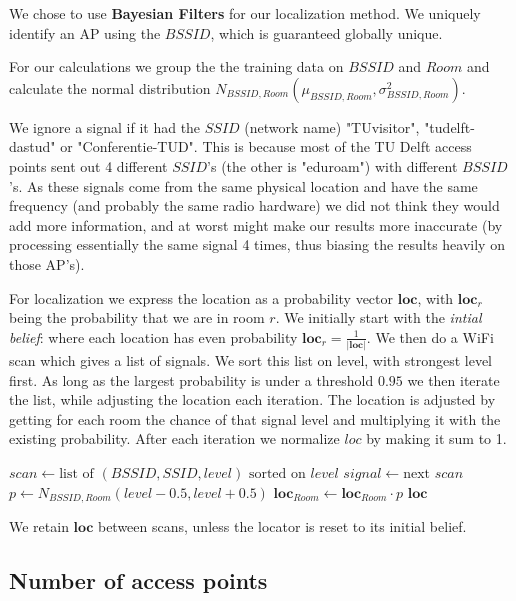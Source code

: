 \documentclass[a4paper,10pt,twoside]{IEEEtran}
\begin{document}
We chose to use \textbf{Bayesian Filters} for our localization method. We uniquely identify an AP using the $BSSID$, which is guaranteed globally unique.

For our calculations we group the the training data on $BSSID$ and $Room$ and calculate the normal distribution $N_{BSSID,Room}(\mu_{BSSID,Room}, \sigma^2_{BSSID,Room})$.

We ignore a signal if it had the $SSID$ (network name) "TUvisitor", "tudelft-dastud" or "Conferentie-TUD".
This is because most of the TU Delft access points sent out 4 different $SSID$'s (the other is "eduroam") with different $BSSID$'s.
As these signals come from the same physical location and have the same frequency (and probably the same radio hardware) we did not think they would add more information, and at worst might make our results more inaccurate (by processing essentially the same signal 4 times, thus biasing the results heavily on those AP's).

For localization we express the location as a probability vector $\mathbf{loc}$, with $\mathbf{loc}_{r}$ being the probability that we are in room $r$. 
We initially start with the \emph{intial belief}: where each location has even probability $\mathbf{loc}_r = \frac{1}{|\mathbf{loc}|}$.
We then do a WiFi scan which gives a list of signals.
We sort this list on level, with strongest level first.
As long as the largest probability is under a threshold $0.95$ we then iterate the list, while adjusting the location each iteration.
The location is adjusted by getting for each room the chance of that signal level and multiplying it with the existing probability. After each iteration we normalize $loc$ by making it sum to 1.
\\
\begin{algorithmic}
	\State $scan \gets \text{list of } (BSSID, SSID, level) \text{ sorted on }level$
		\State $signal \gets \text{next } scan$
			\State $p \gets N_{BSSID,Room}(level-0.5,level+0.5)$
			\State $\mathbf{loc}_{Room} \gets \mathbf{loc}_{Room} \cdot p $
		\EndFor
		\State {} $\mathbf{loc}$
	\EndWhile
\end{algorithmic}

We retain $\mathbf{loc}$ between scans, unless the locator is reset to its initial belief.

\subsection{Number of access points}
\label{subsec:numap}
\end{document}
